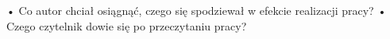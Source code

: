 • Co autor chciał osiągnąć, czego się spodziewał w efekcie realizacji pracy? \newline
• Czego czytelnik dowie się po przeczytaniu pracy? \newline


















